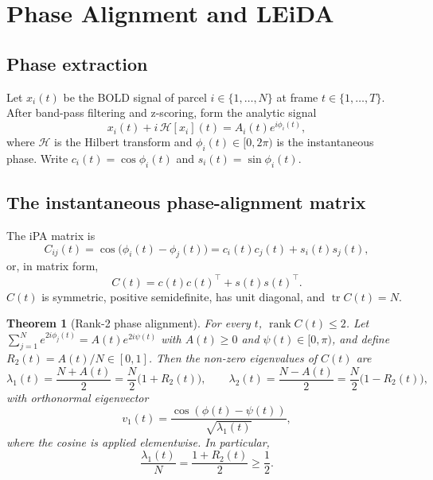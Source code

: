 \documentclass[11pt]{article}
\newtheorem{theorem}{Theorem}
\theoremstyle{definition}
\newcommand{\rank}{\operatorname{rank}}
\newcommand{\tr}{\operatorname{tr}}
\begin{document}
\section{Phase Alignment and LEiDA}
\label{sec:leida}

\subsection{Phase extraction}
Let $x_i(t)$ be the BOLD signal of parcel $i\in\{1,\dots,N\}$ at frame
$t\in\{1,\dots,T\}$. After band-pass filtering and z-scoring, form the analytic signal
\begin{equation}
x_i(t)+i\,\mathcal{H}[x_i](t)=A_i(t)e^{i\phi_i(t)},
\end{equation}
where $\mathcal{H}$ is the Hilbert transform and $\phi_i(t)\in[0,2\pi)$ is the
instantaneous phase. Write $c_i(t)=\cos\phi_i(t)$ and $s_i(t)=\sin\phi_i(t)$.

\subsection{The instantaneous phase-alignment matrix}
The iPA matrix is
\begin{equation}
C_{ij}(t)=\cos\!\big(\phi_i(t)-\phi_j(t)\big)
=c_i(t)c_j(t)+s_i(t)s_j(t),
\end{equation}
or, in matrix form,
\begin{equation}
C(t)=c(t)c(t)^{\top}+s(t)s(t)^{\top}.
\label{eq:Crank}
\end{equation}
$C(t)$ is symmetric, positive semidefinite, has unit diagonal, and $\tr C(t)=N$.

\begin{theorem}[Rank-2 phase alignment]
\label{thm:rank2}
For every $t$, $\rank C(t)\le 2$. Let
$\sum_{j=1}^N e^{2i\phi_j(t)}=A(t)e^{2i\psi(t)}$ with $A(t)\ge0$ and
$\psi(t)\in[0,\pi)$, and define $R_2(t)=A(t)/N\in[0,1]$. Then the non-zero eigenvalues
of $C(t)$ are
\begin{equation}
\lambda_1(t)=\frac{N+A(t)}{2}=\frac{N}{2}\big(1+R_2(t)\big),
\qquad
\lambda_2(t)=\frac{N-A(t)}{2}=\frac{N}{2}\big(1-R_2(t)\big),
\end{equation}
with orthonormal eigenvector
\begin{equation}
v_1(t)=\frac{\cos(\phi(t)-\psi(t))}{\sqrt{\lambda_1(t)}},
\end{equation}
where the cosine is applied elementwise. In particular,
\begin{equation}
\frac{\lambda_1(t)}{N}=\frac{1+R_2(t)}{2}\ge\frac12.
\label{eq:l1identity}
\end{equation}
\end{theorem}
\end{document}
